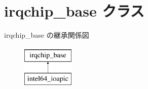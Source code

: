 \hypertarget{classirqchip__base}{}\section{irqchip\+\_\+base クラス}
\label{classirqchip__base}
irqchip\+\_\+base の継承関係図\begin{figure}[H]
\begin{center}
\leavevmode
\includegraphics[height=2.000000cm]{classirqchip__base}
\end{center}
\end{figure}
